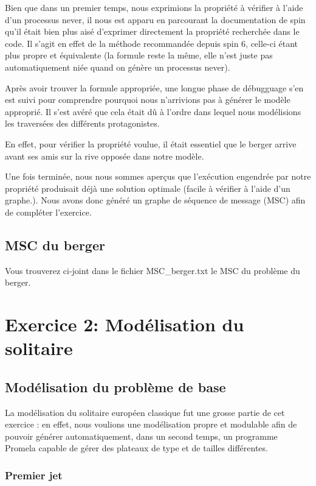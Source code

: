 \documentclass[12pt, a4paper]{report}
\begin{document}
Bien que dans un premier temps, nous exprimions la propriété à vérifier à l'aide d'un processus never, il nous est apparu en parcourant la documentation de spin qu'il était bien plus aisé d'exprimer directement la propriété recherchée dans le code. Il s'agit en effet de la méthode recommandée depuis spin 6, celle-ci étant plus propre et équivalente (la formule reste la même, elle n'est juste pas automatiquement niée quand on génère un processus never).

Après avoir trouver la formule appropriée, une longue phase de débugguage s'en est suivi pour comprendre pourquoi nous n'arrivions pas à générer le modèle approprié. Il s'est avéré que cela était dû à l'ordre dans lequel nous modélisions les traversées des différents protagonistes.

En effet, pour vérifier la propriété voulue, il était essentiel que le berger arrive avant ses amis sur la rive opposée dans notre modèle.

Une fois terminée, nous nous sommes aperçus que l'exécution engendrée par notre propriété produisait déjà une solution optimale (facile à vérifier à l'aide d'un graphe.). Nous avons donc généré un graphe de séquence de message (MSC) afin de compléter l'exercice.

\subsection{MSC du berger}

Vous trouverez ci-joint dans le fichier MSC\_berger.txt le MSC du problème du berger.

\section{Exercice 2: Modélisation du solitaire}

\subsection{Modélisation du problème de base}

La modélisation du solitaire européen classique fut une grosse partie de cet exercice : en effet, nous voulions une modélisation propre et modulable afin de pouvoir générer automatiquement, dans un second temps, un programme Promela capable de gérer des plateaux de type et de tailles différentes.

\subsubsection{Premier jet}
\end{document}
